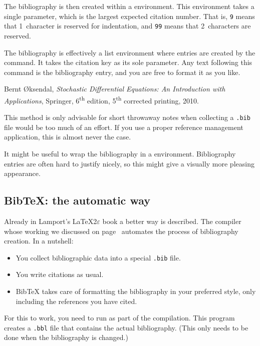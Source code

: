 The bibliography is then created within a  environment.
This environment takes a single parameter,
which is the largest expected citation number.
That is, \verb|9| means that 1~character is reserved for indentation,
and \verb|99| means that 2~characters are reserved.

The bibliography is effectively a list environment
where entries are created by the  command.
It takes the citation key as its sole parameter.
Any text following this command is the bibliography entry,
and you are free to format it as you like.

\begin{ExampleCode}
\begin{thebibliography}{9}

    Bernt \O{}ksendal,
    \textit{Stochastic Differential Equations:
    An Introduction with Applications},
    Springer,
    6\textsuperscript{th} edition, 5\textsuperscript{th} corrected printing,
    2010.

\end{thebibliography}
\end{ExampleCode}

\begin{practices}
This method is only advisable for short throwaway notes
when collecting a \verb|.bib| file would be too much of an effort.
If you use a proper reference management application,
this is almost never the case.
\end{practices}

\begin{technote}
It might be useful to wrap the bibliography in a  environment.
Bibliography entries are often hard to justify nicely,
so this might give a visually more pleasing appearance.
\end{technote}



%
\subsection{BibTeX: the automatic way}

Already in Lamport's \LaTeX2$\varepsilon$ book \cite{lamport} a better way is described.
The  compiler whose working we discussed on page~\pageref{bibtex process}
automates the process of bibliography creation.
In a nutshell:
\begin{itemize}
\item You collect bibliographic data into a special \verb|.bib| file.
\item You write citations as usual.
\item BibTeX takes care of formatting the bibliography in your preferred style,
    only including the references you have cited.
\end{itemize}
%
For this to work, you need to run  as part of the compilation.
This program creates a \verb|.bbl| file that contains the actual bibliography.
(This only needs to be done when the bibliography is changed.)

